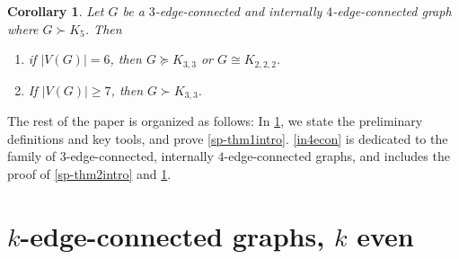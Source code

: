 \documentclass[letterpaper,11pt]{article}
\newtheorem{cor}[theorem]{Corollary}
\theoremstyle{definition}
\begin{document}
\begin{cor}
\label{corintro}
Let $G$ be a $3$-edge-connected and internally $4$-edge-connected graph where $G\succ K_5$. Then
\begin{enumerate}
\item
if $|V(G)|= 6$, then $G\succeq K_{3,3}$ or $G\cong K_{2,2,2}$.
\item
If $|V(G)|\ge 7$, then $G\succ K_{3,3}$.
\end{enumerate}
\end{cor}


The rest of the paper is organized as follows: In  \cref{kecon}, we state the preliminary definitions and key tools, and prove  \cref{sp-thm1intro}.  \cref{in4econ} is dedicated to the family of $3$-edge-connected, internally $4$-edge-connected graphs, and includes the proof of \cref{sp-thm2intro} and \cref{corintro}.





\section{$k$-edge-connected graphs, $k$ even}
\label{kecon}
\end{document}
